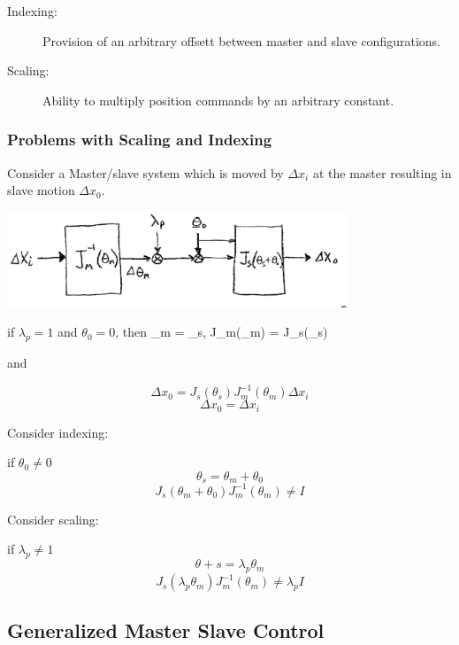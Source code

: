 \begin{description}
\item [Indexing:] Provision of an arbitrary offsett between master and slave configurations.
\item [Scaling:]  Ability to multiply position commands by an arbitrary constant.
\end{description}


\subsubsection{Problems with Scaling and Indexing}
Consider a Master/slave system which is moved by $\Delta x_i$ at the master resulting in slave motion $\Delta x_0$.

\includegraphics[width=4.0in]{figs14/00402.eps}


if $\lambda_p =1$ and $\theta_0 = 0$, then
\bq
\theta_m = \theta_s, J_m(\theta_m) = J_s(\theta_s)
\eq

and

\[
\Delta x_0 = J_s(\theta_s)J^{-1}_m(\theta_m)\Delta x_i
\]
\[
\Delta x_0 = \Delta x_i
\]


Consider indexing:

if $\theta_0 \ne 0$
\[
\theta_s = \theta_m + \theta_0
\]
\[
J_s(\theta_m+\theta_0)J^{-1}_m(\theta_m) \ne I
\]


Consider scaling:

if $\lambda_p \ne 1$
\[
\theta+s = \lambda_p\theta_m
\]
\[
J_s(\lambda_p\theta_m)J^{-1}_m(\theta_m) \ne \lambda_p I
\]




\subsection{Generalized Master Slave Control}

